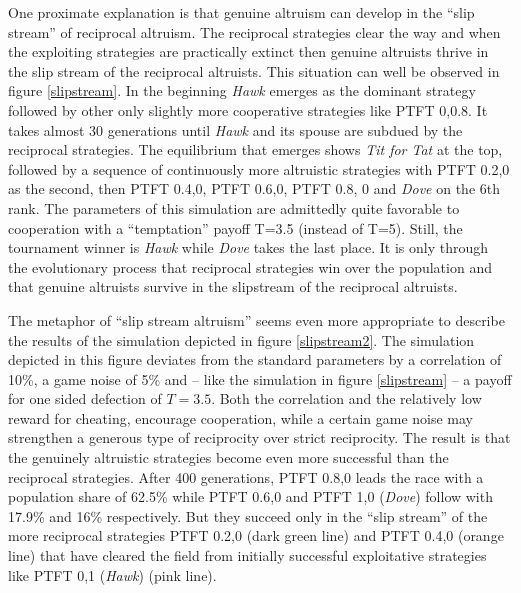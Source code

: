 One proximate explanation is that genuine altruism can develop in the ``slip
stream'' of reciprocal altruism. The reciprocal strategies clear the way and
when the exploiting strategies are practically extinct then genuine altruists
thrive in the slip stream of the reciprocal altruists. This situation can well
be observed in figure \ref{slipstream}. In the beginning {\em Hawk} emerges as
the dominant strategy followed by other only slightly more cooperative
strategies like PTFT 0,0.8. It takes almost 30 generations until {\em Hawk}
and its spouse are subdued by the reciprocal strategies. The equilibrium that
emerges shows {\em Tit for Tat} at the top, followed by a sequence of
continuously more altruistic strategies with PTFT 0.2,0 as the second, then
PTFT 0.4,0, PTFT 0.6,0, PTFT 0.8, 0 and {\em Dove} on the 6th rank. The
parameters of this simulation are admittedly quite favorable to cooperation
with a ``temptation'' payoff T=3.5 (instead of T=5). Still, the tournament
winner is {\em Hawk} while {\em Dove} takes the last place. It is only through
the evolutionary process that reciprocal strategies win over the population
and that genuine altruists survive in the slipstream of the reciprocal
altruists.

The metaphor of ``slip stream altruism'' seems even more appropriate to
describe the results of the simulation depicted in figure \ref{slipstream2}.
The simulation depicted in this figure deviates from the standard parameters
by a correlation of 10\%, a game noise of 5\% and -- like the simulation
in figure \ref{slipstream} -- a payoff for one sided defection of $T=3.5$. Both
the correlation and the relatively low reward for cheating, encourage
cooperation, while a certain game noise may strengthen a generous type of
reciprocity over strict reciprocity. The result is that the genuinely
altruistic strategies become even more successful than the reciprocal
strategies. After 400 generations, PTFT 0.8,0 leads the race with a population
share of 62.5\% while PTFT 0.6,0 and PTFT 1,0 ({\em Dove}) follow with 17.9\%
and 16\% respectively.  But they succeed only in the ``slip stream'' of the
more reciprocal strategies PTFT 0.2,0 (dark green line) and PTFT 0.4,0 (orange
line) that have cleared the field from initially successful exploitative
strategies like PTFT 0,1 ({\em Hawk}) (pink line).

